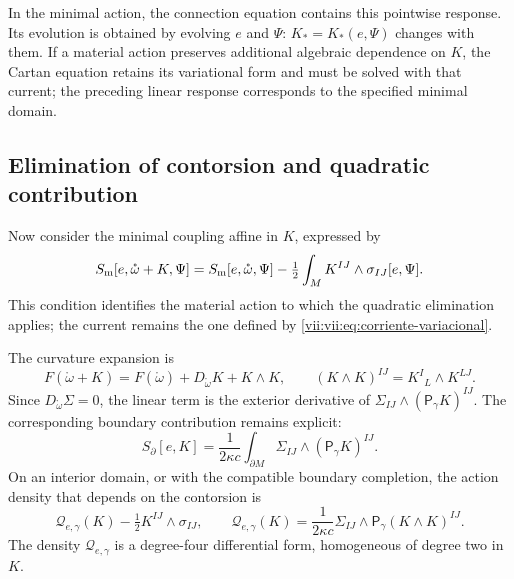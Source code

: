 In the minimal action, the connection equation contains this pointwise response. Its evolution is obtained by evolving \(e\) and \(\Psi\): \(K_*=K_*(e,\Psi)\) changes with them. If a material action preserves additional algebraic dependence on \(K\), the Cartan equation retains its variational form and must be solved with that current; the preceding linear response corresponds to the specified minimal domain.

\subsection{Elimination of contorsion and quadratic contribution}
\label{vii:vii:subsec:respuesta-cuadratica}

Now consider the minimal coupling affine in \(K\), expressed by
\begin{equation}
 S_{\rm m}[e,\mathring\omega+K,\Psi]
 =S_{\rm m}[e,\mathring\omega,\Psi]
   -\tfrac12\int_M K^{IJ}\wedge\sigma_{IJ}[e,\Psi].
 \label{vii:vii:eq:materia-afin-contorsion}
\end{equation}
This condition identifies the material action to which the quadratic elimination applies; the current remains the one defined by \eqref{vii:vii:eq:corriente-variacional}.

The curvature expansion is
\begin{equation}
 F(\mathring\omega+K)
 =F(\mathring\omega)+D_{\mathring\omega}K+K\wedge K,
 \qquad (K\wedge K)^{IJ}=K^I{}_{L}\wedge K^{LJ}.
 \label{vii:vii:eq:curvatura-contorsion}
\end{equation}
Since \(D_{\mathring\omega}\Sigma=0\), the linear term is
the exterior derivative of \(\Sigma_{IJ}\wedge(\mathsf P_\gamma K)^{IJ}\).
The corresponding boundary contribution remains explicit:
\begin{equation}
 S_\partial[e,K]=\frac1{2\kappa c}
     \int_{\partial M}\Sigma_{IJ}\wedge(\mathsf P_\gamma K)^{IJ}.
 \label{vii:vii:eq:borde-contorsion}
\end{equation}
On an interior domain, or with the compatible boundary completion, the action density that depends on the contorsion is
\begin{equation}
 \mathcal Q_{e,\gamma}(K)-\tfrac12K^{IJ}\wedge\sigma_{IJ},
 \qquad
 \mathcal Q_{e,\gamma}(K)
  =\frac1{2\kappa c}\Sigma_{IJ}\wedge
                         \mathsf P_\gamma(K\wedge K)^{IJ}.
 \label{vii:vii:eq:forma-cuadratica-contorsion}
\end{equation}
The density \(\mathcal Q_{e,\gamma}\) is a degree-four differential form, homogeneous of degree two in \(K\).


